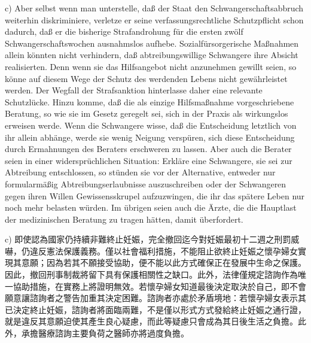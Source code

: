 \documentclass[12pt]{article}
\begin{document}
\syncleft
\begin{sourcepara}
c) Aber selbst wenn man unterstelle, daß der Staat den Schwangerschaftsabbruch weiterhin diskriminiere, verletze er seine verfassungsrechtliche Schutzpflicht schon dadurch, daß er die bisherige Strafandrohung für die ersten zwölf Schwangerschaftswochen ausnahmslos aufhebe. Sozialfürsorgerische Maßnahmen allein könnten nicht verhindern, daß abtreibungswillige Schwangere ihre Absicht realisierten. Denn wenn sie das Hilfsangebot nicht anzunehmen gewillt seien, so könne auf diesem Wege der Schutz des werdenden Lebens nicht gewährleistet werden. Der Wegfall der Strafsanktion hinterlasse daher eine relevante Schutzlücke. Hinzu komme, daß die als einzige Hilfsmaßnahme vorgeschriebene Beratung, so wie sie im Gesetz geregelt sei, sich in der Praxis als wirkungslos erweisen werde. Wenn die Schwangere wisse, daß die Entscheidung letztlich von ihr allein abhänge, werde sie wenig Neigung verspüren, sich diese Entscheidung durch Ermahnungen des Beraters erschweren zu lassen. Aber auch die Berater seien in einer widersprüchlichen Situation: Erkläre eine Schwangere, sie sei zur Abtreibung entschlossen, so stünden sie vor der Alternative, entweder nur formularmäßig Abtreibungserlaubnisse auszuschreiben oder der Schwangeren gegen ihren Willen Gewissensskrupel aufzuzwingen, die ihr das spätere Leben nur noch mehr belasten würden. Im übrigen seien auch die Ärzte, die die Hauptlast der medizinischen Beratung zu tragen hätten, damit überfordert.
\end{sourcepara}
\begin{transpara}
c) 即使認為國家仍持續非難終止妊娠，完全撤回迄今對妊娠最初十二週之刑罰威嚇，仍違反憲法保護義務。僅以社會福利措施，不能阻止欲終止妊娠之懷孕婦女實現其意願；因為若其不願接受協助，便不能以此方式確保正在發展中生命之保護。因此，撤回刑事制裁將留下具有保護相關性之缺口。此外，法律僅規定諮詢作為唯一協助措施，在實務上將證明無效。若懷孕婦女知道最後決定取決於自己，即不會願意讓諮詢者之警告加重其決定困難。諮詢者亦處於矛盾境地：若懷孕婦女表示其已決定終止妊娠，諮詢者將面臨兩難，不是僅以形式方式發給終止妊娠之通行證，就是違反其意願迫使其產生良心疑慮，而此等疑慮只會成為其日後生活之負擔。此外，承擔醫療諮詢主要負荷之醫師亦將過度負擔。
\end{transpara}
\end{document}

